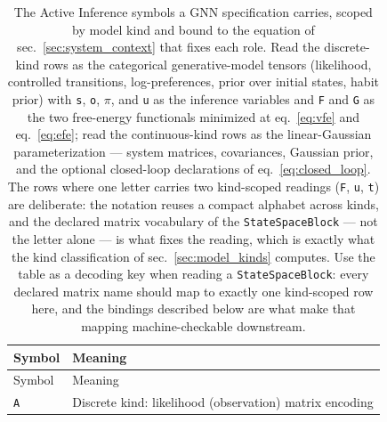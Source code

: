 \documentclass[
  english,
  9pt,
]{extarticle}
\begin{document}
\begin{longtable}[]{@{}
  >{\raggedright\arraybackslash}p{}
  >{\raggedright\arraybackslash}p{}@{}}
\caption{The Active Inference symbols a GNN specification carries,
scoped by model kind and bound to the equation of
sec.~\ref{sec:system_context} that fixes each role. Read the
discrete-kind rows as the categorical generative-model tensors
(likelihood, controlled transitions, log-preferences, prior over initial
states, habit prior) with \protect\texttt{s}, \protect\texttt{o},
\protect\texttt{\texorpdfstring{\ensuremath{\pi}}{pi}}, and \protect\texttt{u} as the inference variables
and \protect\texttt{F} and \protect\texttt{G} as the two free-energy
functionals minimized at eq.~\ref{eq:vfe} and eq.~\ref{eq:efe}; read the
continuous-kind rows as the linear-Gaussian parameterization --- system
matrices, covariances, Gaussian prior, and the optional closed-loop
declarations of eq.~\ref{eq:closed_loop}. The rows where one letter
carries two kind-scoped readings (\protect\texttt{F},
\protect\texttt{u}, \protect\texttt{t}) are deliberate: the notation
reuses a compact alphabet across kinds, and the declared matrix
vocabulary of the \protect\texttt{StateSpaceBlock} --- not the letter
alone --- is what fixes the reading, which is exactly what the kind
classification of sec.~\ref{sec:model_kinds} computes. Use the table as
a decoding key when reading a \protect\texttt{StateSpaceBlock}: every
declared matrix name should map to exactly one kind-scoped row here, and
the \protect{} bindings described
below are what make that mapping machine-checkable
downstream.}\label{tbl:actinf_symbols}\tabularnewline
\toprule\noalign{}
\begin{minipage}[b]{\linewidth}\raggedright
Symbol
\end{minipage} & \begin{minipage}[b]{\linewidth}\raggedright
Meaning
\end{minipage} \\
\midrule\noalign{}
\endfirsthead
\toprule\noalign{}
\begin{minipage}[b]{\linewidth}\raggedright
Symbol
\end{minipage} & \begin{minipage}[b]{\linewidth}\raggedright
Meaning
\end{minipage} \\
\midrule\noalign{}
\endhead
\bottomrule\noalign{}
\endlastfoot
\texttt{A} & Discrete kind: likelihood (observation) matrix encoding

\end{longtable}
\end{document}
